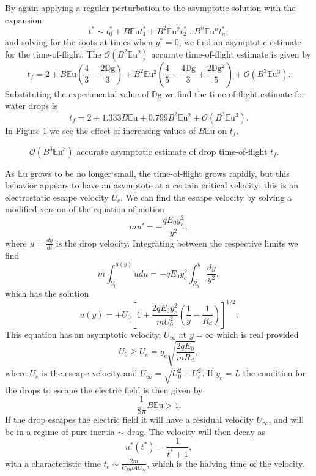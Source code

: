 \documentclass[12pt,a4paper,oneside]{book}
\begin{document}
By again applying a regular perturbation to the asymptotic solution with the expansion
\[ t^* \sim t^*_0 + B \mathbb{E}\mbox{u} t^*_1 + B^2 \mathbb{E}\mbox{u}^2 t^*_2 \ldots B^n \mathbb{E}\mbox{u}^n t^*_n  
,\]
and solving for the roots at times when $y^* = 0$, we find an asymptotic estimate for the time-of-flight. The $\mathcal{O}(B^2 \mathbb{E}\mbox{u}^2)$ accurate time-of-flight estimate is given by
\[t_f = 2 + B \mathbb{E}\mbox{u} \left(\frac{4}{3} - \frac{2 \mathbb{D}\mbox{g}}{3}\right) + B^2 \mathbb{E}\mbox{u}^{2} \left(\frac{4}{5} - \frac{4 \mathbb{D}\mbox{g}}{3} + \frac{2 \mathbb{D}\mbox{g}^{2}}{5}\right) + \mathcal{O}(B^3 \mathbb{E}\mbox{u}^3).\]
Substituting the experimental value of $\mathbb{D}\mbox{g}$ we find the time-of-flight estimate for water drops is
\begin{equation} \label{time_of_flight}
t_f = 2 + 1.333 B \mathbb{E}\mbox{u} + 0.799 B^2 \mathbb{E}\mbox{u}^{2} + \mathcal{O}(B^3 \mathbb{E}\mbox{u}^3). 
\end{equation} 
In Figure \ref{fig:drag} we see the effect of increasing values of $B \mathbb{E}\mbox{u}$ on $t_f$.
\begin{figure}[htb]
    \centering
    
    \caption{$\mathcal{O}(B^3 \mathbb{E}\mbox{u}^3)$ accurate asymptotic estimate of drop time-of-flight $t_f$.}
    \label{fig:drag}
\end{figure}
As $\mathbb{E}\mbox{u}$ grows to be no longer small, the time-of-flight grows rapidly, but this behavior appears to have an asymptote at a certain critical velocity; this is an electrostatic escape velocity $U_e$. We can find the escape velocity by solving a modified version of the equation of motion
\[ m u' = - \frac{q E_0 y_c^2}{y^2}, \]
where $u = \frac{d y}{d t}$ is the drop velocity. Integrating between the respective limits we find
\[m \int^{u(y)}_{U_0} u du = -q E_0 y_c^2 \int^y_{R_d} \frac{dy}{y^2} ,\]
which has the solution
\[ u(y) = \pm U_0 \left[1 + \frac{2q E_0 y_c^2}{m U_0^2} \left( \frac{1}{y} - \frac{1}{R_d} \right) \right]^{1/2}.
\]
This equation has an asymptotic velocity, $U_{\infty}$ at $y = \infty$ which is real provided 
\[ U_0 \geq  U_e = y_c \sqrt{\frac{2 q E_0 }{m R_d}},
\]
where $U_e$ is the escape velocity and $U_{\infty} = \sqrt{U_0^2 - U_e^2}$. If $y_c=L$ the condition for the drops to escape the electric field is then given by
\begin{equation}\label{escape}
\frac{1}{8 \pi} B \mathbb{E}\mbox{u} > 1.
\end{equation}
If the drop escapes the electric field it will have a residual velocity $U_{\infty}$, and will be in a regime of pure inertia $\sim$ drag. The velocity will then decay as
\[
u^*(t^*) = \frac{1}{t^* + 1},
\]
with a characteristic time $t_c \sim \frac{2 m}{C_D \rho A U_{\infty}}$, which is the halving time of the velocity.
\end{document}

